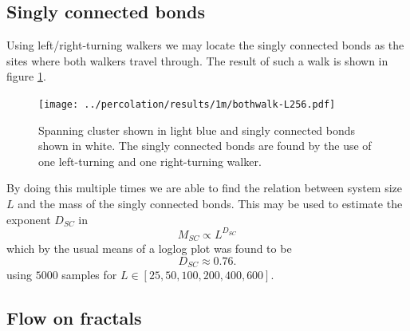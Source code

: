 \documentclass[a4paper,reprint,floatfix,amsmath,amssymb,aps,pra]{revtex4-1}
\begin{document}
\subsection{Singly connected bonds}

Using left/right-turning walkers we may locate the singly connected bonds as the sites where both walkers travel through. The result of such a walk is shown in figure \ref{fig:bothwalk}.
%
\begin{figure}
  \centering
  \texttt{[image: ../percolation/results/1m/bothwalk-L256.pdf]}
  \caption{Spanning cluster shown in light blue and singly connected bonds shown in white. The singly connected bonds are found by the use of one left-turning and one right-turning walker.}
  \label{fig:bothwalk}
\end{figure}
%
By doing this multiple times we are able to find the relation between system size $L$ and the mass of the singly connected bonds. This may be used to estimate the exponent $D_{SC}$ in
\begin{equation}
  M_{SC} \propto L^{D_{SC}}
\end{equation}
which by the usual means of a loglog plot was found to be
\begin{equation}
  D_{SC} \approx 0.76.
\end{equation} 
using $5000$ samples for $L \in [25,50,100,200,400,600]$.

\subsection{Flow on fractals}
\end{document}
